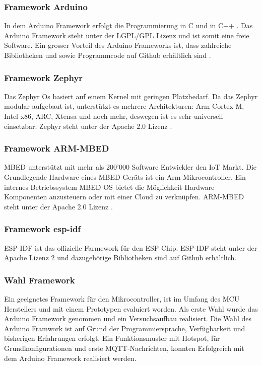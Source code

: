\subsubsection{Framework Arduino}
In dem Arduino Framework erfolgt die Programmierung in C und in C++ . Das Arduino Framework steht unter der LGPL/GPL Lizenz und ist somit eine freie Software. Ein grosser Vorteil des Arduino Frameworks ist, dass zahlreiche Bibliotheken und sowie Programmcode auf  Github erhältlich sind \cite{noauthor_arduino_nodate}.

\subsubsection{Framework Zephyr}
Das Zephyr Os basiert auf einem Kernel mit geringen Platzbedarf. Da das Zephyr modular aufgebaut ist, unterstützt es mehrere Architekturen: Arm Cortex-M, Intel x86, ARC, Xtensa und noch mehr, deswegen ist es sehr universell einsetzbar. Zephyr steht unter der Apache 2.0 Lizenz \cite{noauthor_introducing_nodate}. 

\subsubsection{Framework ARM-MBED}
MBED unterstützt mit mehr als 200'000 Software Entwickler den IoT Markt. Die Grundlegende Hardware eines MBED-Geräts ist ein Arm Mikrocontroller. Ein internes Betriebssystem MBED OS bietet die Möglichkeit Hardware Komponenten anzusteuern oder mit einer Cloud zu verknüpfen. ARM-MBED steht unter der Apache 2.0 Lizenz \cite{noauthor_mbed_nodate}.

\subsubsection{Framework esp-idf}
ESP-IDF ist das offizielle Farmework für den ESP Chip. ESP-IDF steht unter der Apache Lizenz 2  \cite{noauthor_get_nodate-1} und dazugehörige Bibliotheken sind auf Github erhältlich. 

\subsubsection{Wahl Framework}
Ein geeignetes Framework für den Mikrocontroller, ist im Umfang des MCU Herstellers und mit einem Prototypen evaluiert worden. Als erste Wahl wurde das Arduino Framework genommen und ein Versuchsaufbau realisiert. Die Wahl des Arduino Framwork ist auf Grund der Programmiersprache, Verfügbarkeit und bisherigen Erfahrungen erfolgt. Ein Funktionsmuster mit Hotspot, für Grundkonfigurationen und erste MQTT-Nachrichten, konnten Erfolgreich mit dem Arduino Framework realisiert werden.

